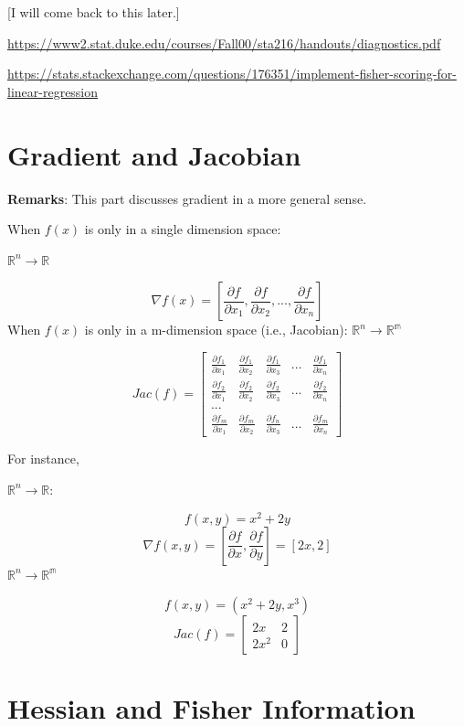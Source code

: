 \documentclass[
]{book}
\begin{document}
{[}I will come back to this later.{]}

\url{https://www2.stat.duke.edu/courses/Fall00/sta216/handouts/diagnostics.pdf}

\url{https://stats.stackexchange.com/questions/176351/implement-fisher-scoring-for-linear-regression}

\hypertarget{gradient-and-jacobian}{%
\section{Gradient and Jacobian}\label{gradient-and-jacobian}}

\textbf{Remarks}: This part discusses gradient in a more general sense.

When \(f(x)\) is only in a single dimension space:

\(\mathbb{R}^n \rightarrow \mathbb{R}\)

\[\nabla f(x)=[\frac{\partial f}{\partial x_1},\frac{\partial f}{\partial x_2},...,\frac{\partial f}{\partial x_n}]\]
When \(f(x)\) is only in a m-dimension space (i.e., Jacobian):
\(\mathbb{R}^n \rightarrow \mathbb{R^m}\)

\[Jac(f)=\begin{bmatrix}
\frac{\partial f_1}{\partial x_1} & \frac{\partial f_1}{\partial x_2} & \frac{\partial f_1}{\partial x_3} & ... & \frac{\partial f_1}{\partial x_n}\\
\frac{\partial f_2}{\partial x_1} & \frac{\partial f_2}{\partial x_2} & \frac{\partial f_2}{\partial x_3} & ... & \frac{\partial f_2}{\partial x_n} \\
...\\
\frac{\partial f_m}{\partial x_1} & \frac{\partial f_m}{\partial x_2} & \frac{\partial f_n}{\partial x_3} & ... & \frac{\partial f_m}{\partial x_n}
\end{bmatrix}\]

For instance,

\(\mathbb{R}^n \rightarrow \mathbb{R}\):

\[f(x,y)=x^2+2y\]
\[\nabla f(x,y)=[\frac{\partial f}{\partial x},\frac{\partial f}{\partial y}]=[2x,2]\]
\(\mathbb{R}^n \rightarrow \mathbb{R^m}\)

\[f(x,y)=(x^2+2y,x^3)\]
\[Jac(f)=\begin{bmatrix}
2x & 2\\
2x^2 & 0 
\end{bmatrix}\]

\hypertarget{hessian-and-fisher-information}{%
\section{Hessian and Fisher Information}\label{hessian-and-fisher-information}}
\end{document}

